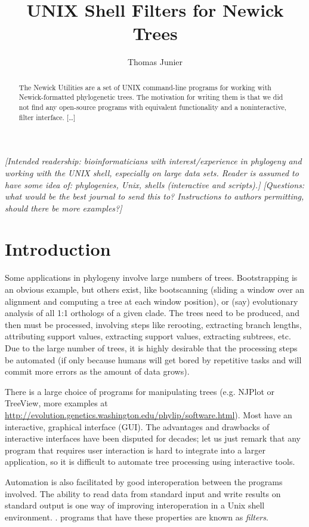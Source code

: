 \documentclass[a4paper,11pt]{article}
\title{UNIX Shell Filters for Newick Trees}
\author{Thomas Junier}
\newcommand{\gui}{\textsc{GUI}}
\newcommand{\unix}{Unix}
\begin{document}
\maketitle

\begin{abstract}
The Newick Utilities are a set of UNIX command-line programs for working with
Newick-formatted phylogenetic trees. The motivation for writing them is that we did not find any open-source programs with equivalent functionality and a noninteractive, filter interface. [\ldots]
\end{abstract}

\textit{\noindent{} [Intended readership: bioinformaticians with interest/experience in phylogeny and working with the UNIX shell, especially on large data sets. Reader is assumed to have some idea of: phylogenies, Unix, shells (interactive and scripts).]
[Questions: what would be the best journal to send this to? Instructions to authors permitting, should there be more examples?]}
 
\section*{Introduction}

Some applications in phylogeny involve large numbers of trees. Bootstrapping is an obvious example, but others exist, like bootscanning (sliding a window over an alignment and computing a tree at each window position), or (say) evolutionary analysis of all 1:1 orthologs of a given clade. The trees need to be produced, and then must be processed, involving steps like rerooting, extracting branch lengths, attributing support values, extracting support values, extracting subtrees, etc. Due to the large number of trees, it is highly desirable that the processing steps be automated (if only because humans will get bored by repetitive tasks and will commit more errors as the amount of data grows).

There is a large choice of programs for manipulating trees (e.g.
NJPlot or TreeView, more examples at \url{
http://evolution.genetics.washington.edu/phylip/software.html}). Most have an interactive, graphical interface (\gui{}). The advantages and drawbacks of interactive interfaces have been disputed for decades; let us just remark that any program that requires user interaction is hard to integrate into a larger application, so it is difficult to automate tree processing using interactive tools.

Automation is also facilitated by good interoperation between the programs involved. The ability to read data from standard input and write results on standard output is one way of improving interoperation in a \unix{} shell environment. \cite{Gancarz2002}. programs that have these properties are known as \textit{filters}.
\end{document}
